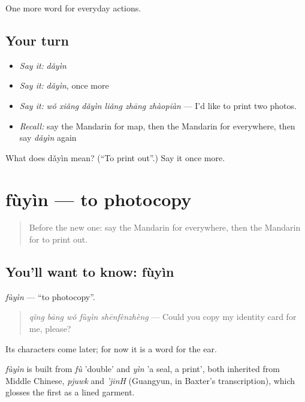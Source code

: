 \begin{grammarlens}[title={What you've built}]
One more word for everyday actions.
\end{grammarlens}

\subsection*{Your turn}
\begin{itemize}
\raggedright
  \item \emph{Say it:} \emph{dǎyìn}
  \item \emph{Say it:} \emph{dǎyìn}, once more
  \item \emph{Say it:} \emph{wǒ xiǎng dǎyìn liǎng zhāng zhàopiàn} — I'd like to print two photos.
  \item \emph{Recall:} say the Mandarin for map, then the Mandarin for everywhere, then say \emph{dǎyìn} again
\end{itemize}

\begin{tcolorbox}[breakable,colback=teal!4,colframe=teal!35!black,title={Before you move on}]
What does dǎyìn mean? (\textquotedblleft{}To print out\textquotedblright{}.) Say it once more.
\end{tcolorbox}
\section[fùyìn]{fùyìn — to photocopy}

\label{lesson:ZH-C212-fuyin}



\begin{quote}
Before the new one: say the Mandarin for everywhere, then the Mandarin for to print out.
\end{quote}

\subsection*{You'll want to know: fùyìn}
\emph{fùyìn} — \textquotedblleft{}to photocopy\textquotedblright{}.

\begin{quote}
\emph{qǐng bāng wǒ fùyìn shēnfènzhèng} — Could you copy my identity card for me, please?
\end{quote}

Its characters come later; for now it is a word for the ear.

\begin{cousinweb}
\emph{fùyìn} is built from \emph{fù} 'double' and \emph{yìn} 'a seal, a print', both inherited from Middle Chinese, \emph{pjuwk} and \emph{'jinH} (Guangyun, in Baxter's transcription), which glosses the first as a lined garment.
\end{cousinweb}

